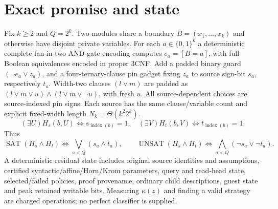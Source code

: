 \documentclass[11pt]{article}
\begin{document}
\section{Exact promise and state}
Fix $k\ge2$ and $Q=2^k$. Two modules share a boundary $B=(x_1,\dots,x_k)$ and otherwise have disjoint private variables. For each $a\in\{0,1\}^k$ a deterministic complete fan-in-two AND-gate encoding computes $e_a=[B=a]$, with full Boolean equivalences encoded in proper 3CNF. Add a padded binary guard $(\neg e_a\lor z_a)$, and a four-ternary-clause pin gadget fixing $z_a$ to source sign-bit $s_a$, respectively $t_a$. Width-two clauses $(l\lor m)$ are padded as $(l\lor m\lor u)\wedge(l\lor m\lor\neg u)$, with fresh $u$. All source-dependent choices are source-indexed pin signs. Each source has the same clause/variable count and explicit fixed-width length $N_k=\Theta(k^2 2^k)$.
\[
(\exists U)H_s(b,U)\iff s_{\operatorname{index}(b)}=1,\quad
(\exists V)H_t(b,V)\iff t_{\operatorname{index}(b)}=1.
\]
Thus
\[
\operatorname{SAT}(H_s\wedge H_t)\iff\bigvee_{a<Q}(s_a\land t_a),\qquad
\operatorname{UNSAT}(H_s\wedge H_t)\iff\bigwedge_{a<Q}(\neg s_a\lor\neg t_a).\tag{1}
\]
A deterministic residual state includes original source identities and assumptions, certified syntactic/affine/Horn/Krom parameters, query and read-head state, selected/failed policies, proof provenance, ordinary child descriptions, guest state and peak retained writable bits. Measuring $\kappa(z)$ and finding a valid strategy are charged operations; no perfect classifier is supplied.
\end{document}
